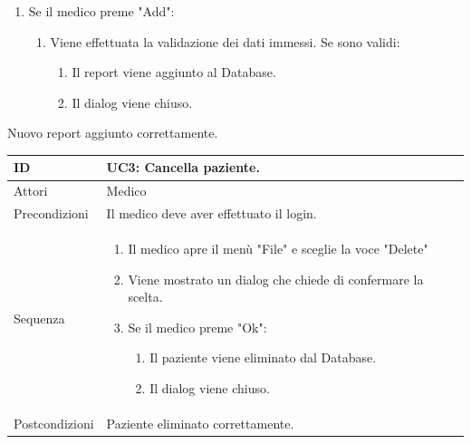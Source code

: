 \documentclass[a4paper, 11pt]{article}
\newcommand{\usecase}[5]{%
	\begin{table}[H]
		\centering
		\renewcommand{\familydefault}{\ttdefault}\normalfont
		\begin{tabular}{| >{\fontseries{b}\selectfont} p{0.3\textwidth} | L |}
			\hline
			ID&{#1}\\\hline
			Attori&{#2}\\\hline
			Precondizioni&{#3}\\\hline
			Sequenza&{#4}\\\hline
			Postcondizioni&{#5}\\\hline
		\end{tabular}
	\end{table}
	
}
\begin{document}
{\begin{enumerate}[label*=\arabic*., nosep]
\begin{enumerate}[label*=\arabic*., nosep]
\begin{enumerate}[label*=\arabic*., nosep]
\begin{enumerate}[label*=\arabic*., nosep]
\begin{enumerate}[label*=\arabic*., nosep]
								\item Il dialog viene chiuso.
							\end{enumerate}
						\end{enumerate}
					\end{enumerate}
					\item Se il medico preme "Add":
					\begin{enumerate}[label*=\arabic*., nosep]
						\item Viene effettuata la validazione dei dati immessi. Se sono validi:	
						\begin{enumerate}[label*=\arabic*., nosep]
							\item La terapia farmacologica viene aggiunta al Database.
							\item Il dialog viene chiuso.
						\end{enumerate}
					\end{enumerate}
				\end{enumerate}
				\item Se il medico preme "Add":				
				\begin{enumerate}[label*=\arabic*., nosep]
					\item Viene effettuata la validazione dei dati immessi. Se sono validi:	
					\begin{enumerate}[label*=\arabic*., nosep]
						\item Il report viene aggiunto al Database.
						\item Il dialog viene chiuso.
					\end{enumerate}
				\end{enumerate}
			\end{enumerate}
		}
		{Nuovo report aggiunto correttamente.}
		
		\usecase{UC3: Cancella paziente.}
		{Medico}
		{Il medico deve aver effettuato il login.}
		{%
			\begin{enumerate}[label*=\arabic*., nosep]
				\item Il medico apre il menù "File" e sceglie la voce "Delete"
				\item Viene mostrato un dialog che chiede di confermare la scelta.
				\item Se il medico preme "Ok":
				\begin{enumerate}[label*=\arabic*., nosep]
					\item Il paziente viene eliminato dal Database.
					\item Il dialog viene chiuso.
				\end{enumerate}					
			\end{enumerate}
		}
		{Paziente eliminato correttamente.}
		
\end{document}
